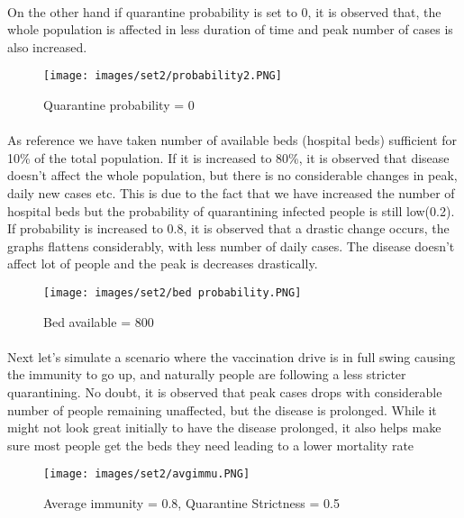 \documentclass[12pt, a4paper]{extarticle}
\begin{document}
    \vspace{0.2in}
    \newpage
    \paragraph{} On the other hand if quarantine probability is set to 0, it is observed that, the whole population is affected in less duration of time and peak number of cases is also increased.
    \vspace{0.2in}
    \begin{figure}[h]
        \centering
        \texttt{[image: images/set2/probability2.PNG]}
        \caption{Quarantine probability = 0}
    \end{figure}
    
    \newpage
    \paragraph{} As reference we have taken number of available beds (hospital beds) sufficient for 10\% of the total population. If it is increased to 80\%, it is observed that disease doesn't affect the whole population, but there is no considerable changes in peak, daily new cases etc. This is due to the fact that we have increased the number of hospital beds but the probability of quarantining infected people is still low(0.2). If probability is increased to 0.8, it is observed that a drastic change occurs, the graphs flattens considerably, with less number of daily cases. The disease doesn't affect lot of people and the peak is decreases drastically.
    \vspace{0.2in}
    \begin{figure}[h]
        \centering
        \texttt{[image: images/set2/bed probability.PNG]}
        \caption{Bed available = 800}
    \end{figure}
    
    \newpage
    \paragraph{} Next let's simulate a scenario where the vaccination drive is in full swing causing the immunity to go up, and naturally people are following a less stricter quarantining. No doubt, it is observed that peak cases drops with considerable number of people remaining unaffected, but the disease is prolonged. While it might not look great initially to have the disease prolonged, it also helps make sure most people get the beds they need leading to a lower mortality rate
    \vspace{0.2in}
    \begin{figure}[h]
        \centering
        \texttt{[image: images/set2/avgimmu.PNG]}
        \caption{Average immunity = 0.8, Quarantine Strictness = 0.5}
    \end{figure}
    
\end{document}
